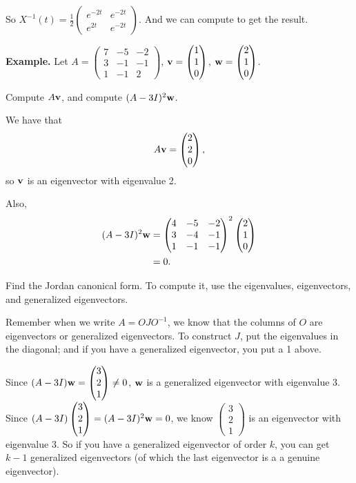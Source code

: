 \documentclass{article}
\newcommand{\mat}[1]{\begin{pmatrix}#1\end{pmatrix}}
\begin{document}
So $X^{-1}(t) = \frac{1}{2} \mat{e^{-2t} & e^{-2t} \\ e^{2t} & e^{-2t}}$.  And we can compute to get the result.

{\bf Example.} Let $A = \mat{7 & -5 & -2 \\ 3 & -1 & -1 \\ 1 & -1 & 2}$, $\mbf{v} = \mat{1 \\ 1 \\ 0}$, $\mbf{w} = \mat{2 \\ 1 \\ 0}$.

Compute $A \mathbf{v}$, and compute $(A - 3I)^2 \mathbf{w}$.

We have that
\begin{align*}
  A \mbf{v} = \mat{2 \\ 2 \\ 0},
\end{align*}
so $\mathbf{v}$ is an eigenvector with eigenvalue 2.

Also,
\begin{align*}
  (A - 3I)^2 \mbf{w} &= \mat{4 & -5 & -2 \\ 3 & -4 & -1 \\ 1 & -1 & -1}^2 \mat{2 \\ 1 \\ 0} \\
  &= 0.
\end{align*}

Find the Jordan canonical form.  To compute it, use the eigenvalues, eigenvectors, and generalized eigenvectors.

Remember when we write $A = O J O^{-1}$, we know that the columns of $O$ are eigenvectors or generalized eigenvectors.  To construct $J$, put the eigenvalues in the diagonal; and if you have a generalized eigenvector, you put a 1 above.

Since $(A - 3 I) \mbf{w} = \mat{3 \\ 2 \\ 1} \neq 0$, $\mathbf{w}$ is a generalized eigenvector with eigenvalue 3.  Since $(A - 3I) \mat{3 \\ 2 \\ 1} = (A - 3I)^2 \mbf{w} = 0$, we know $\mat{3 \\ 2 \\ 1}$ is an eigenvector with eigenvalue $3$.  So if you have a generalized eigenvector of order $k$, you can get $k-1$ generalized eigenvectors (of which the last eigenvector is a a genuine eigenvector).
\end{document}
